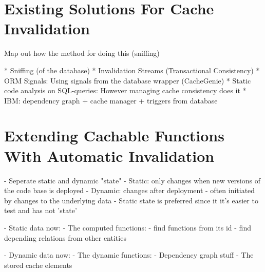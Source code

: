 





\section{Existing Solutions For Cache Invalidation}
\label{sec:existing_solutions_for_cache_invalidation}

Map out how the method for doing this (sniffing)

* Sniffing (of the database)
* Invalidation Streams (Transactional Consistency)
* ORM Signals: Using signals from the database wrapper (CacheGenie)
* Static code analysis on SQL-queries: However managing cache consistency does it
* IBM: dependency graph + cache manager + triggers from database




\section{Extending Cachable Functions With Automatic Invalidation}
\label{sec:extending_cachable_functions_with_automatic_invalidation}





- Seperate static and dynamic "state"
  - Static: only changes when new versions of the code base is deployed
  - Dynamic: changes after deployment - often initiated by changes to the
             underlying data
  - Static state is preferred since it it's easier to test and has not 'state'

- Static data now:
  - The computed functions:
    - find functions from its id
    - find depending relations from other entities

- Dynamic data now:
  - The dynamic functions:
    - Dependency graph stuff
    - The stored cache elements

